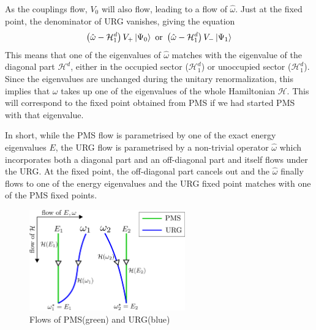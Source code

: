 As the couplings flow, \(V_0\) will also flow, leading to a flow of \(\hat\omega\). Just at the fixed point, the denominator of URG vanishes, giving the equation
\begin{equation}\begin{aligned}
	\left(\hat\omega - \mathcal{H}_1^d\right)V_+\ket{\Psi_0} \text{ or } \left(\hat\omega - \mathcal{H}_1^d\right)V_-\ket{\Psi_1}
\end{aligned}\end{equation}
This means that one of the eigenvalues of \(\hat\omega\) matches with the eigenvalue of the diagonal part \(\mathcal{H}^d\), either in the occupied sector (\(\mathcal{H}^d_1\)) or unoccupied sector (\(\mathcal{H}^d_1\)). Since the eigenvalues are unchanged during the unitary renormalization, this implies that \(\omega\) takes up one of the eigenvalues of the whole Hamiltonian \(\mathcal{H}\). This will correspond to the fixed point obtained from PMS if we had started PMS with that eigenvalue.

In short, while the PMS flow is parametrised by one of the exact energy eigenvalues \(E\), the URG flow is parametrised by a non-trivial operator \(\hat \omega\) which incorporates both a diagonal part and an off-diagonal part and itself flows under the URG. At the fixed point, the off-diagonal part cancels out and the \(\hat\omega\) finally flows to one of the energy eigenvalues and the URG fixed point matches with one of the PMS fixed points.
\begin{figure}
\centering
\includegraphics[width=0.6\textwidth]{pms_vs_urg.png}
\caption{Flows of PMS(green) and URG(blue)}
\end{figure}

